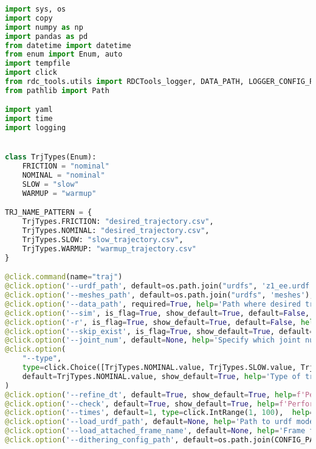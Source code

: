 \begin{lstlisting}[language=python, caption=\raggedright{execution/exec\_trajectory.py}, frame=single]
import sys, os
import copy
import numpy as np
import pandas as pd
from datetime import datetime
from enum import Enum, auto
import tempfile
import click
from rdc_tools.utils import RDCTools_logger, DATA_PATH, LOGGER_CONFIG_PATH, URDF_PATH, CONFIG_PATH
from pathlib import Path

import yaml
import time
import logging


class TrjTypes(Enum):
    FRICTION = "nominal"
    NOMINAL = "nominal"
    SLOW = "slow"
    WARMUP = "warmup"

TRJ_NAME_PATTERN = {
    TrjTypes.FRICTION: "desired_trajectory.csv",
    TrjTypes.NOMINAL: "desired_trajectory.csv",
    TrjTypes.SLOW: "slow_trajectory.csv",
    TrjTypes.WARMUP: "warmup_trajectory.csv"
}

@click.command(name="traj")
@click.option('--urdf_path', default=os.path.join("urdfs", 'z1_ee.urdf'), help='Path to urdf model')
@click.option('--meshes_path', default=os.path.join("urdfs", 'meshes'), help='Path to model meshes')
@click.option('--data_path', required=True, help='Path where desired trajectories are stored')
@click.option('--sim', is_flag=True, show_default=True, default=False, help='If true, script will be running in simulation')
@click.option('-r', is_flag=True, show_default=True, default=False, help='If true, script will recursively be executed for every founded desired_trajectory.csv file')
@click.option('--skip_exist', is_flag=True, show_default=True, default=False, help='If true, script will skip folders where recordings exist')
@click.option('--joint_num', default=None, help='Specify which joint num use. Works only for friction trajectories')
@click.option(
    "--type",
    type=click.Choice([TrjTypes.NOMINAL.value, TrjTypes.SLOW.value, TrjTypes.WARMUP.value], case_sensitive=False),
    default=TrjTypes.NOMINAL.value, show_default=True, help='Type of trajectory'
)
@click.option('--refine_dt', default=True, show_default=True, help=f'Perform checking dt between points in trajectory and recalculate trajectory for lower dt')
@click.option('--check', default=True, show_default=True, help=f'Perform checking on trajectory self-collision, qoint limits and collision with floor before execution')
@click.option('--times', default=1, type=click.IntRange(1, 100),  help='Count of trajectory repeats')
@click.option('--load_urdf_path', default=None, help='Path to urdf model for nominal load')
@click.option('--load_attached_frame_name', default=None, help='Frame from robot URDF to attach the load model')
@click.option('--dithering_config_path', default=os.path.join(CONFIG_PATH, 'dithering_config.yaml'), help='Path to config for dithering')


\end{lstlisting}
